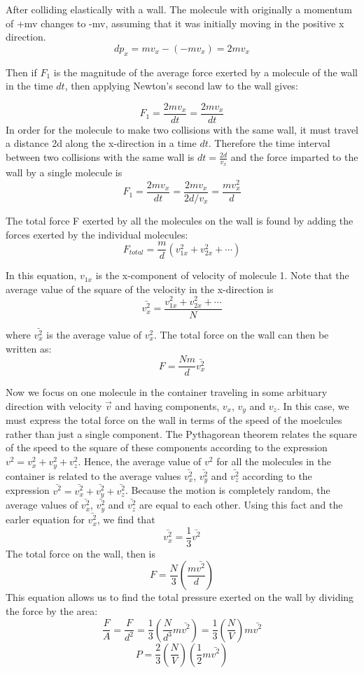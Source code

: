 After colliding elastically with a wall. The molecule with originally a momentum of +mv changes to -mv, assuming that it was initially moving in the positive x direction.
$$d p_x = mv_x-(-mv_x) = 2mv_x$$

Then if $F_1$ is the magnitude of the average force exerted by a molecule of the wall in the time $d t$, then applying Newton's second law to the wall gives:

$$F_1 = \frac{2mv_x}{d t} = \frac{2 mv_x}{d t}$$
In order for the molecule to make two collisions with the same wall, it must travel a distance 2d along the x-direction in a time $d t$. Therefore the time interval between two collisions with the same wall is $d t=\frac{2d}{v_x}$ and the force imparted to the wall by a single molecule is
$$F_1=\frac{2mv_x}{d t}=\frac{2mv_x}{2d/v_x}=\frac{mv_x^2}{d}$$

The total force F exerted by all the molecules on the wall is found by adding the forces exerted by the individual molecules:
$$F_{total} = \frac{m}{d}(v_{1x} ^2 +v_{2x} ^2 +\cdots)$$

In this equation, $v_{1x}$ is the x-component of velocity of molecule 1.
Note that the average value of the square of the velocity in the x-direction is
$$\bar{v_x^2}=\frac{v_{1x}^2+v_{2x}^2 + \cdots}{N}$$

where $\bar{v_x^2}$ is the average value of $v_x^2$. The total force on the wall can then be written as:
$$F=\frac{Nm}{d}\bar{v_x^2}$$

Now we focus on one molecule in the container traveling in some arbituary direction with velocity $\vec{v}$ and having components, $v_x$, $v_y$ and $v_z$. In this case, we must express the total force on the wall in terms of the speed of the moelcules rather than just a single component. The Pythagorean theorem relates the square of the speed to the square of these components according to the expression $v^2 = v_x^2 + v_y^2 + v_z^2$. Hence, the average value of $v^2$ for all the molecules in the container is related to the average values $\bar{v_x^2}$, $\bar{v_y^2}$ and $\bar{v_z^2}$ according to the expression $\bar{v^2} = \bar{v_x^2} +\bar{v_y^2}+\bar{v_z^2}$. Because the motion is completely random, the average values of $\bar{v_x^2}$, $\bar{v_y^2}$ and $\bar{v_z^2}$ are equal to each other. Using this fact and the earler equation for $\bar{v_x^2}$, we find that
$$\bar{v_x^2} = \frac{1}{3}\bar{v^2}$$
The total force on the wall, then is
$$F=\frac{N}{3}\left(\frac{m\bar{v^2}}{d}\right)$$
This equation allows us to find the total pressure exerted on the wall by dividing the force by the area:
$$\frac{F}{A} = \frac{F}{d^2} = \frac{1}{3}\left(\frac{N}{d^3}m\bar{v^2}\right) = \frac{1}{3}\left(\frac{N}{V}\right)m\bar{v^2}$$
$$P=\frac{2}{3}\left(\frac{N}{V}\right)\left(\frac{1}{2}m\bar{v^2}\right)$$

